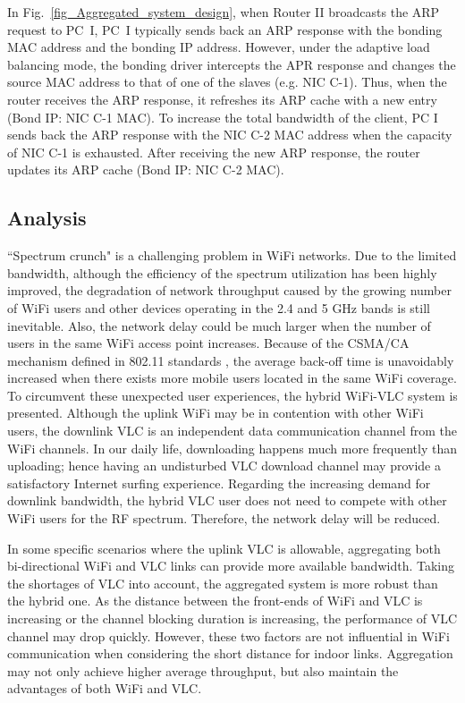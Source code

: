 \documentclass[10pt,journal]{IEEEtran}
\begin{document}
In Fig.~\ref{fig_Aggregated_system_design}, when Router II broadcasts the ARP request to PC~I, PC~I typically sends back an ARP response with the bonding MAC address and the bonding IP address. However, under the adaptive load balancing mode, the bonding driver intercepts the APR response and changes the source MAC address to that of one of the slaves (e.g. NIC C-1). Thus, when the router receives the ARP response, it refreshes its ARP cache with a new entry (Bond IP: NIC C-1 MAC). To increase the total bandwidth of the client, PC I sends back the ARP response with the NIC C-2 MAC address when the capacity of NIC C-1 is exhausted. After receiving the new ARP response, the router updates its ARP cache (Bond IP: NIC C-2 MAC).

\subsection{Analysis}
``Spectrum crunch" \cite{kavehrad2013optical} is a challenging problem in WiFi networks. Due to the limited bandwidth, although the efficiency of the spectrum utilization has been highly improved, the degradation of network throughput caused by the growing number of WiFi users and other devices operating in the 2.4 and 5 GHz bands is still inevitable. Also, the network delay could be much larger when the number of users in the same WiFi access point increases. Because of the CSMA/CA mechanism defined in 802.11 standards \cite{bianchi1996performance}, the average back-off time is unavoidably increased when there exists more mobile users located in the same WiFi coverage. To circumvent these unexpected user experiences, the hybrid WiFi-VLC system is presented. Although the uplink WiFi may be in contention with other WiFi users, the downlink VLC is an independent data communication channel from the WiFi channels. In our daily life, downloading happens much more frequently than uploading; hence having an undisturbed VLC download channel may provide a satisfactory Internet surfing experience. Regarding the increasing demand for downlink bandwidth, the hybrid VLC user does not need to compete with other WiFi users for the RF spectrum. Therefore, the network delay will be reduced.

In some specific scenarios where the uplink VLC is allowable, aggregating both bi-directional WiFi and VLC links can provide more available bandwidth. Taking the shortages of VLC into account, the aggregated system is more robust than the hybrid one. As the distance between the front-ends of WiFi and VLC is increasing or the channel blocking duration is increasing, the performance of VLC channel may drop quickly. However, these two factors are not influential in WiFi communication when considering the short distance for indoor links. Aggregation may not only achieve higher average throughput, but also maintain the advantages of both WiFi and VLC.
\end{document}
